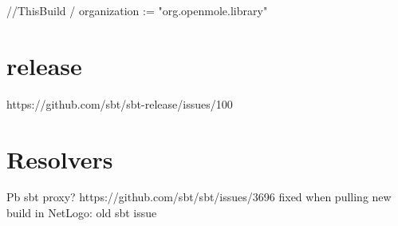 //ThisBuild / organization := "org.openmole.library"


\section*{release}

https://github.com/sbt/sbt-release/issues/100

\section*{Resolvers}

Pb sbt proxy? https://github.com/sbt/sbt/issues/3696 fixed when pulling new build in NetLogo: old sbt issue


%
%



